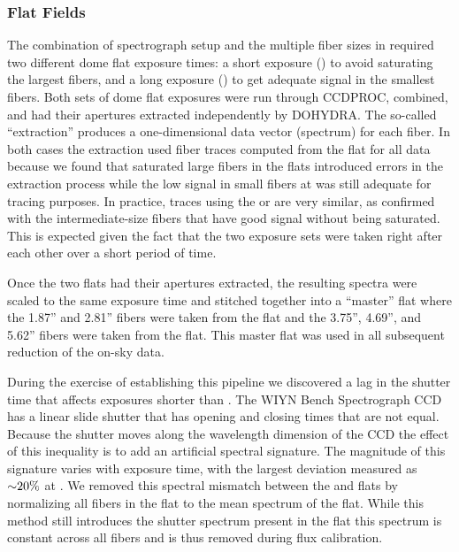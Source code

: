 \subsubsection{Flat Fields}
\label{891_1:sec:flats}

The combination of spectrograph setup and the multiple fiber sizes in
\GP required two different dome flat exposure times: a short exposure
() to avoid saturating the largest fibers, and a long
exposure () to get adequate signal in the smallest fibers.
Both sets of dome flat exposures were run through CCDPROC, combined,
and had their apertures extracted independently by DOHYDRA.  The
so-called ``extraction'' produces a one-dimensional data vector
(spectrum) for each fiber. In both cases the extraction used fiber
traces computed from the  flat for all data because we found
that saturated large fibers in the  flats introduced errors
in the extraction process while the low signal in small fibers at
 was still adequate for tracing purposes. In practice,
traces using the  or  are very similar, as
confirmed with the intermediate-size fibers that have good signal
without being saturated. This is expected given the fact that the two
exposure sets were taken right after each other over a short period of
time.

Once the two flats had their apertures extracted, the resulting
spectra were scaled to the same exposure time and stitched together
into a ``master'' flat where the 1.87'' and 2.81'' fibers were taken
from the  flat and the 3.75'', 4.69'', and 5.62'' fibers
were taken from the  flat. This master flat was used in all
subsequent reduction of the on-sky data.

During the exercise of establishing this pipeline we discovered a lag
in the shutter time that affects exposures shorter than . The WIYN Bench Spectrograph CCD has a linear slide shutter
that has opening and closing times that are not equal. Because the
shutter moves along the wavelength dimension of the CCD the effect of
this inequality is to add an artificial spectral signature. The
magnitude of this signature varies with exposure time, with the
largest deviation measured as ${\sim} 20\%$ at . We removed
this spectral mismatch between the  and  flats by
normalizing all fibers in the  flat to the mean spectrum of
the  flat. While this method still introduces the shutter
spectrum present in the  flat this spectrum is constant
across all fibers and is thus removed during flux calibration.

